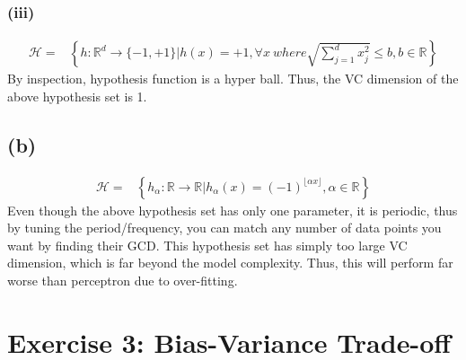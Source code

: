 \documentclass[11pt]{article}
\begin{document}
\subsubsection*{(iii)}
\begin{equation}
\begin{split}
\mathcal{H}=&\left\{h:\mathbb{R}^d\rightarrow\{-1,+1\}|h(x)=+1,\forall x\ where \sqrt{\sum_{j=1}^{d} x_j^2}\le b, b\in\mathbb{R}\right\}
\end{split}
\end{equation}
By inspection, hypothesis function is a hyper ball. Thus, the VC dimension of the above hypothesis set is 1.

\subsection*{(b)}
\begin{equation}
\begin{split}
\mathcal{H}=&\left\{h_\alpha:\mathbb{R}\rightarrow\mathbb{R}|h_\alpha(x)=(-1)^{\lfloor \alpha x\rfloor},\alpha\in\mathbb{R}\right\}
\end{split}
\end{equation}
Even though the above hypothesis set has only one parameter, it is periodic, thus by tuning the period/frequency, you can match any number of data points you want by finding their GCD.
This hypothesis set has simply too large VC dimension, which is far beyond the model complexity. Thus, this will perform far worse than perceptron due to over-fitting.

\pagebreak
\section*{Exercise 3: Bias-Variance Trade-off}
\end{document}

